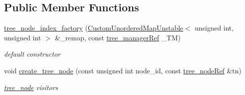 \subsection*{Public Member Functions}
\begin{DoxyCompactItemize}
\item 
\hyperlink{structtree__node__index__factory_ab7ae7b8d50387e481d2cc5f9f9004323}{tree\+\_\+node\+\_\+index\+\_\+factory} (\hyperlink{custom__map_8hpp_a8cbaceffc09790a885ec7e9c17809c69}{Custom\+Unordered\+Map\+Unstable}$<$ unsigned int, unsigned int $>$ \&\+\_\+remap, const \hyperlink{tree__manager_8hpp_a96ff150c071ce11a9a7a1e40590f205e}{tree\+\_\+manager\+Ref} \+\_\+\+TM)
\begin{DoxyCompactList}\small\item\em default constructor \end{DoxyCompactList}\item 
void \hyperlink{structtree__node__index__factory_a786ee30f904dd9e3fc7428195b6bec81}{create\+\_\+tree\+\_\+node} (const unsigned int node\+\_\+id, const \hyperlink{tree__node_8hpp_a6ee377554d1c4871ad66a337eaa67fd5}{tree\+\_\+node\+Ref} \&tn)
\begin{DoxyCompactList}\small\item\em \hyperlink{classtree__node}{tree\+\_\+node} visitors \end{DoxyCompactList}\end{DoxyCompactItemize}
